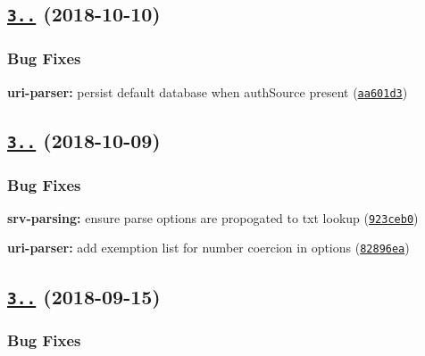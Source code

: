 \label{_3.1.7}%
 \subsection*{\href{https://github.com/mongodb-js/mongodb-core/compare/v3.1.6...v3.1.7}{\tt 3..} (2018-\/10-\/10)}

\subsubsection*{Bug Fixes}


\begin{DoxyItemize}
\item {\bfseries uri-\/parser\+:} persist default database when auth\+Source present (\href{https://github.com/mongodb-js/mongodb-core/commit/aa601d3}{\tt aa601d3})
\end{DoxyItemize}

\label{_3.1.6}%
 \subsection*{\href{https://github.com/mongodb-js/mongodb-core/compare/v3.1.4...v3.1.6}{\tt 3..} (2018-\/10-\/09)}

\subsubsection*{Bug Fixes}


\begin{DoxyItemize}
\item {\bfseries srv-\/parsing\+:} ensure parse options are propogated to txt lookup (\href{https://github.com/mongodb-js/mongodb-core/commit/923ceb0}{\tt 923ceb0})
\item {\bfseries uri-\/parser\+:} add exemption list for number coercion in options (\href{https://github.com/mongodb-js/mongodb-core/commit/82896ea}{\tt 82896ea})
\end{DoxyItemize}

\label{_3.1.5}%
 \subsection*{\href{https://github.com/mongodb-js/mongodb-core/compare/v3.1.4...v3.1.5}{\tt 3..} (2018-\/09-\/15)}

\subsubsection*{Bug Fixes}


